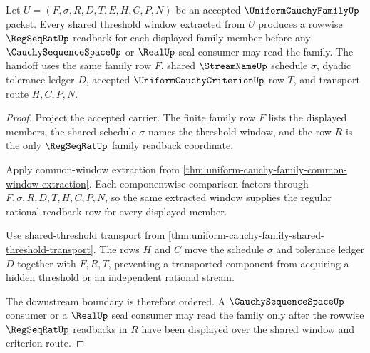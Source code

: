 \begin{theorem}
\label{thm:uniform-cauchy-family-regseqrat-handoff}
Let $U=(F,\sigma,R,D,T,E,H,C,P,N)$ be an accepted $\UniformCauchyFamilyUp$ packet. Every shared threshold window extracted from $U$ produces a rowwise $\RegSeqRatUp$ readback for each displayed family member before any $\CauchySequenceSpaceUp$ or $\RealUp$ seal consumer may read the family. The handoff uses the same family row $F$, shared $\StreamNameUp$ schedule $\sigma$, dyadic tolerance ledger $D$, accepted $\UniformCauchyCriterionUp$ row $T$, and transport route $H,C,P,N$.
\end{theorem}
\begin{proof}
Project the accepted carrier. The finite family row $F$ lists the displayed members, the shared schedule $\sigma$ names the threshold window, and the row $R$ is the only $\RegSeqRatUp$ family readback coordinate.

Apply common-window extraction from \autoref{thm:uniform-cauchy-family-common-window-extraction}. Each componentwise comparison factors through $F,\sigma,R,D,T,H,C,P,N$, so the same extracted window supplies the regular rational readback row for every displayed member.

Use shared-threshold transport from \autoref{thm:uniform-cauchy-family-shared-threshold-transport}. The rows $H$ and $C$ move the schedule $\sigma$ and tolerance ledger $D$ together with $F,R,T$, preventing a transported component from acquiring a hidden threshold or an independent rational stream.

The downstream boundary is therefore ordered. A $\CauchySequenceSpaceUp$ consumer or a $\RealUp$ seal consumer may read the family only after the rowwise $\RegSeqRatUp$ readbacks in $R$ have been displayed over the shared window and criterion route.
\end{proof}

